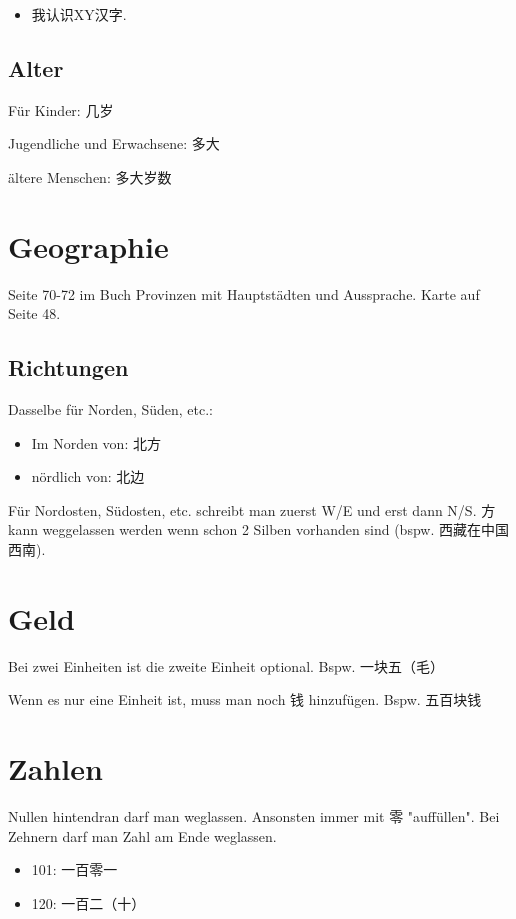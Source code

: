 \documentclass[UTF8]{ctexart}
\begin{document}
\begin{itemize}
    \item 我认识XY汉字.
\end{itemize}

\subsection{Alter}

Für Kinder: 几岁

Jugendliche und Erwachsene: 多大

ältere Menschen: 多大岁数

\section{Geographie}

Seite 70-72 im Buch Provinzen mit Hauptstädten und Aussprache. Karte auf Seite 48.


\subsection{Richtungen}

Dasselbe für Norden, Süden, etc.:

\begin{itemize}
    \item Im Norden von: 北方
    \item nördlich von: 北边
\end{itemize}

Für Nordosten, Südosten, etc. schreibt man zuerst W/E und erst dann N/S. 方 kann weggelassen werden wenn schon 2 Silben vorhanden sind (bspw. 西藏在中国西南).

\section{Geld}

Bei zwei Einheiten ist die zweite Einheit optional. Bspw. 一块五（毛）

Wenn es nur eine Einheit ist, muss man noch 钱 hinzufügen. Bspw. 五百块钱

\section{Zahlen}

Nullen hintendran darf man weglassen. Ansonsten immer mit 零 "auffüllen". Bei Zehnern darf man Zahl am Ende weglassen.

\begin{itemize}
    \item 101: 一百零一
    \item 120: 一百二（十）
\end{itemize}
\end{document}
